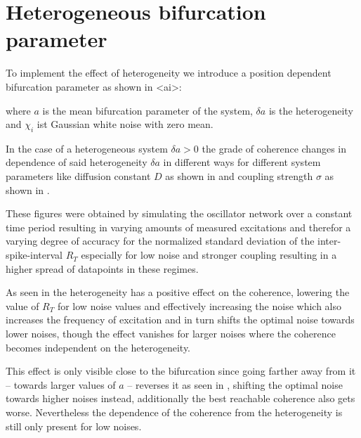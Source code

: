 \section{Heterogeneous bifurcation parameter}
\label{sec:hetero-a}

To implement the effect of heterogeneity we introduce a position dependent bifurcation parameter as shown in \eq<ai>:


where $a$ is the mean bifurcation parameter of the system, $\delta a$ is the heterogeneity and $\chi_i$ ist Gaussian white noise with zero mean.

In the case of a heterogeneous system $\delta a > 0$ the grade of coherence changes in dependence of said heterogeneity $\delta a$
in different ways for different system parameters like diffusion constant $D$ as shown in  and
coupling strength $\sigma$ as shown in .

These figures were obtained by simulating the oscillator network over a constant time period resulting in varying amounts of measured excitations
and therefor a varying degree of accuracy for the normalized standard deviation of the inter-spike-interval $R_T$ especially for low noise
and stronger coupling resulting in a higher spread of datapoints in these regimes.

As seen in  the heterogeneity has a positive effect on the coherence, lowering the value of $R_T$ for low noise values
and effectively increasing the noise which also increases the frequency of excitation
and in turn shifts the optimal noise towards lower noises, though the effect vanishes for larger noises where the coherence becomes independent on the heterogeneity.

This effect is only visible close to the bifurcation since going farther away from it -- towards larger values of $a$ -- reverses it as seen in ,
shifting the optimal noise towards higher noises instead, additionally the best reachable coherence also gets worse.
Nevertheless the dependence of the coherence from the heterogeneity is still only present for low noises.


